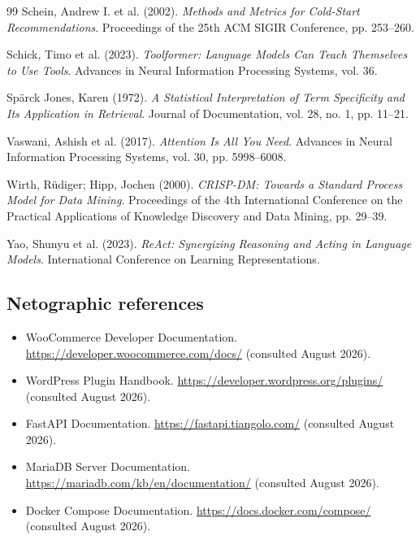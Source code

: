 \begin{thebibliography}{99}
Schein, Andrew I. et al. (2002).
\textit{Methods and Metrics for Cold-Start Recommendations}.
Proceedings of the 25th ACM SIGIR Conference, pp. 253--260.

Schick, Timo et al. (2023).
\textit{Toolformer: Language Models Can Teach Themselves to Use Tools}.
Advances in Neural Information Processing Systems, vol. 36.

Sp\"arck Jones, Karen (1972).
\textit{A Statistical Interpretation of Term Specificity and Its Application in
Retrieval}.
Journal of Documentation, vol. 28, no. 1, pp. 11--21.

Vaswani, Ashish et al. (2017).
\textit{Attention Is All You Need}.
Advances in Neural Information Processing Systems, vol. 30, pp. 5998--6008.

Wirth, R\"udiger; Hipp, Jochen (2000).
\textit{CRISP-DM: Towards a Standard Process Model for Data Mining}.
Proceedings of the 4th International Conference on the Practical Applications
of Knowledge Discovery and Data Mining, pp. 29--39.

Yao, Shunyu et al. (2023).
\textit{ReAct: Synergizing Reasoning and Acting in Language Models}.
International Conference on Learning Representations.

\end{thebibliography}

\subsection*{Netographic references}

\begin{itemize}[leftmargin=1.2em]
  \item WooCommerce Developer Documentation.
        \url{https://developer.woocommerce.com/docs/}
        (consulted August 2026).
  \item WordPress Plugin Handbook.
        \url{https://developer.wordpress.org/plugins/}
        (consulted August 2026).
  \item FastAPI Documentation.
        \url{https://fastapi.tiangolo.com/}
        (consulted August 2026).
  \item MariaDB Server Documentation.
        \url{https://mariadb.com/kb/en/documentation/}
        (consulted August 2026).
  \item Docker Compose Documentation.
        \url{https://docs.docker.com/compose/}
        (consulted August 2026).
\end{itemize}

\clearpage
